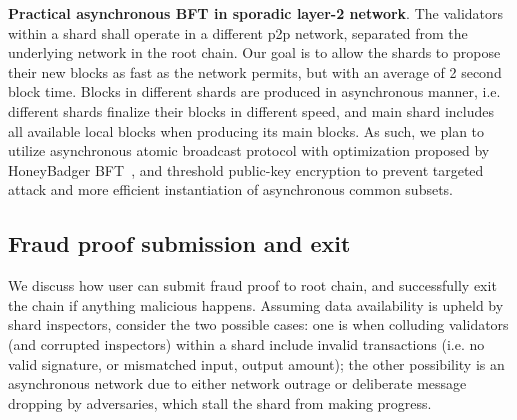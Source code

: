 \textbf{Practical asynchronous BFT in sporadic layer-2 network}. The validators within a shard shall operate in a different p2p network, separated from the underlying network in the root chain.
Our goal is to allow the shards to propose their new blocks as fast as the network permits, but with an average of 2 second block time. Blocks in different shards are produced in asynchronous manner, i.e. different shards finalize their blocks in different speed, and main shard includes all available local blocks when producing its main blocks. As such, we plan to utilize asynchronous atomic broadcast protocol with optimization proposed by HoneyBadger BFT~\cite{honeybadger}, and threshold public-key encryption to prevent targeted attack and more efficient instantiation of asynchronous common subsets.


\subsection{Fraud proof submission and exit}
We discuss how user can submit fraud proof to root chain, and successfully exit the \codename chain if anything malicious happens. Assuming data availability is upheld by shard inspectors, consider the two possible cases: one is when colluding validators (and corrupted inspectors) within a shard include invalid transactions (i.e. no valid signature, or mismatched input, output amount); the other possibility is an asynchronous network due to either network outrage or deliberate message dropping by adversaries, which stall the shard from making progress.

